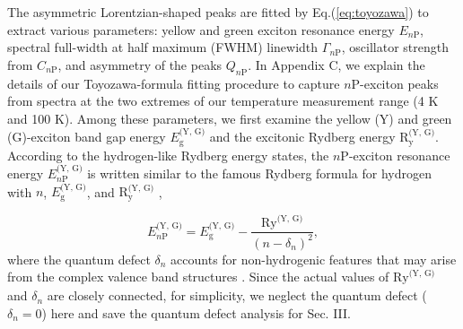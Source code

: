\documentclass[aps,reprint,amsmath,amssymb,prb]{revtex4-1}
\begin{document}
The asymmetric Lorentzian-shaped peaks are fitted by Eq.(\ref{eq:toyozawa}) to extract various parameters: yellow and green exciton resonance energy $E_{n\text{P}}$, %
spectral full-width at half maximum (FWHM) linewidth $\Gamma_{n\text{P}}$, oscillator strength from $C_{n\text{P}}$, and asymmetry of the peaks $Q_{n\text{P}}$. In Appendix C, we explain the details of our Toyozawa-formula fitting procedure to capture $n$P-exciton peaks from spectra at the two extremes of our temperature measurement range (4 K and 100 K). Among these parameters, we first examine the yellow (Y) and green (G)-exciton band gap energy $E_{\text{g}}^{\text{(Y, G)}}$ and the excitonic Rydberg energy $\text{R}_{\text{y}}^{\text{(Y, G)}}$. According to the hydrogen-like Rydberg energy states,   the $n$P-exciton resonance energy $E_{n\text{P}}^{\text{(Y, G)}}$ is written similar to the famous Rydberg formula for hydrogen with $n$, $E_{\text{g}}^{\text{(Y, G)}}$, and $\text{R}_{\text{y}}^{\text{(Y, G)}}$ \cite{Schone2016QD},

\begin{equation}\label{eq:scalingEn}
E_{n \text{P}}^{\text{(Y, G)}} = E_{\text{g}}^{\text{(Y, G)}}-\frac{\text{Ry}^{\text{(Y, G)}}}{\left(n-\delta_{n}\right)^2},
\end{equation}
where the quantum defect $\delta_{n}$ accounts for non-hydrogenic features that may arise from the complex valence band structures \cite{Schone2016}. Since the actual values of $\text{Ry}_{\text{}}^{\text{(Y, G)}}$ and $\delta_{n}$ are closely connected, for simplicity, we neglect the quantum defect ($\delta_n = 0$) here and save the quantum defect analysis for Sec. III.
 
\end{document}
